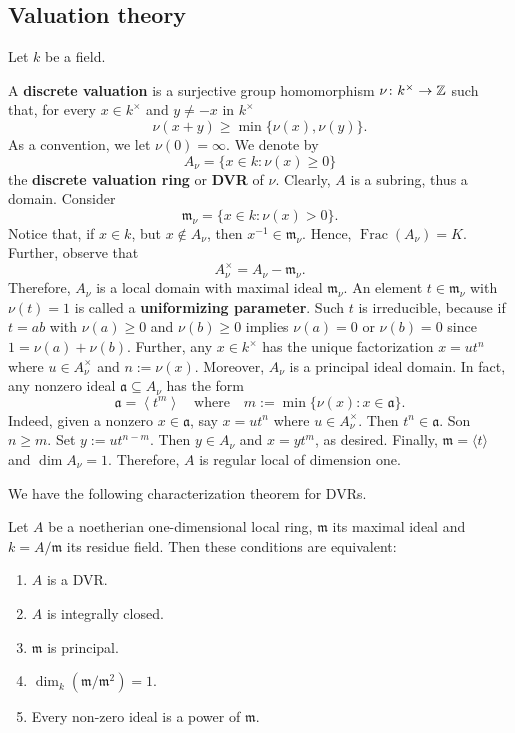 \subsection*{Valuation theory}
Let $k$ be a field. 
\begin{definition}\label{def:discrete-valuation}
	A \textbf{discrete valuation} is a surjective group homomorphism $\nu\colon k^{\times} \to {\mathbb Z}$ such that, for every $x\in k^{\times}$ and $y \neq -x$ in $k^{\times}$
	\[
		\nu(x + y) \geq \min\{\nu(x), \nu(y)\}.
	\]
	As a convention, we let $\nu(0) = \infty$. We denote by
	\[
	A_{\nu} = \{x \in k\colon \nu(x)\geq 0\}
	\]
	the \textbf{discrete valuation ring} or \textbf{DVR} of $\nu$. Clearly, $A$ is a subring, thus a domain. Consider
	\[
		\mathfrak{m}_{\nu} = \{x\in k\colon \nu(x) > 0\}. 
	\]
	Notice that, if $x\in k$, but $x\notin A_{\nu}$, then $x^{-1}\in \mathfrak{m}_{\nu}$. Hence, $\operatorname{Frac}(A_{\nu}) = K$. Further, observe that
	\[
	A_{\nu}^{\times} = A_{\nu} - \mathfrak{m}_{\nu}.
	\]
	Therefore, $A_{\nu}$ is a local domain with maximal ideal $\mathfrak{m}_{\nu}$. An element $t \in \mathfrak{m}_{\nu}$ with $\nu(t) = 1$ is called a \textbf{uniformizing parameter}. Such $t$ is irreducible, because if $t = ab$ with $\nu(a)\geq 0$ and $\nu(b)\geq 0$ implies $\nu(a) = 0$ or $\nu(b) = 0$ since $1 = \nu(a) + \nu(b)$. Further, any $x \in k^{\times}$ has the unique factorization $x = u t^{n}$ where $u \in A_{\nu}^{\times}$ and $n := \nu(x)$. Moreover, $A_{\nu}$ is a principal ideal domain. In fact, any nonzero ideal $\mathfrak{a} \subseteq A_{\nu}$ has the form
	\[
		\mathfrak{a} = \left\langle t^{m}\right\rangle \quad\text{where}\quad m:=\min\{\nu(x)\colon x\in \mathfrak{a}\}.
	\]
	Indeed, given a nonzero $x \in \mathfrak{a}$, say $x = ut^{n}$ where $u \in A_{\nu}^{\times}$. Then $t^{n}\in \mathfrak{a}$. Son $n \geq m$. Set $y := ut^{n-m}$. Then $y\in A_\nu$ and $x = yt^{m}$, as desired. Finally, $\mathfrak{m} = \langle t\rangle$ and $\dim A_{\nu} = 1$. Therefore, $A$ is regular local of dimension one.
\end{definition}
We have the following characterization theorem for DVRs.
\begin{theorem}\label{thm:characterization-of-DVRs}
	Let $A$ be a noetherian one-dimensional local ring, $\mathfrak{m}$ its maximal ideal and $k = A/\mathfrak{m}$ its residue field. Then these conditions are equivalent:
	\begin{enumerate}[label = (\roman*)]
		\item $A$ is a DVR.
		\item $A$ is integrally closed.
		\item $\mathfrak{m}$ is principal.
		\item $\dim_{k}(\mathfrak{m}/\mathfrak{m}^{2}) = 1$.
		\item Every non-zero ideal is a power of $\mathfrak{m}$.
	\end{enumerate}
\end{theorem}
